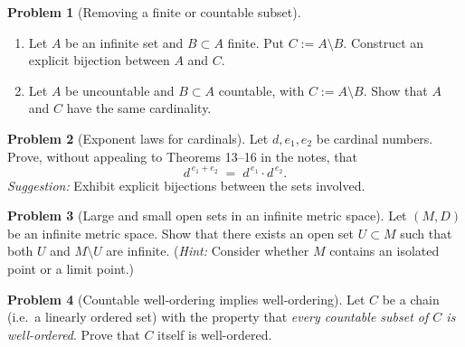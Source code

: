 \documentclass[12pt]{article}
\theoremstyle{definition} %
\newtheorem{problem}{Problem}
\theoremstyle{plain} %
\begin{document}
\begin{problem}[Removing a finite or countable subset]
  \begin{enumerate}[label=(\alph*)]
    \item Let $A$ be an infinite set and $B\subset A$ finite.
          Put $C:=A\setminus B$.  Construct an explicit bijection
          between $A$ and $C$.
    \item Let $A$ be uncountable and $B\subset A$ countable, with
          $C:=A\setminus B$.  Show that $A$ and $C$ have the same
          cardinality.
  \end{enumerate}
\end{problem}

\begin{problem}[Exponent laws for cardinals]
  Let $d,e_{1},e_{2}$ be cardinal numbers.
  Prove, without appealing to Theorems 13–16 in the notes, that
  \[
      d^{\,e_{1}+e_{2}}\;=\;
      d^{\,e_{1}}\cdot d^{\,e_{2}}.
  \]
  \emph{Suggestion:}  Exhibit explicit bijections between the sets
  involved.
\end{problem}

\begin{problem}[Large and small open sets in an infinite metric space]
  Let $(M,D)$ be an infinite metric space.
  Show that there exists an open set $U\subset M$ such that both
  $U$ and $M\setminus U$ are infinite.
  (\emph{Hint:}  Consider whether $M$ contains an isolated point or a
  limit point.)
\end{problem}

\begin{problem}[Countable well-ordering implies well-ordering]
  Let $C$ be a chain (i.e.\ a linearly ordered set) with the property
  that \emph{every countable subset of $C$ is well-ordered}.
  Prove that $C$ itself is well-ordered.
\end{problem}
\end{document}
